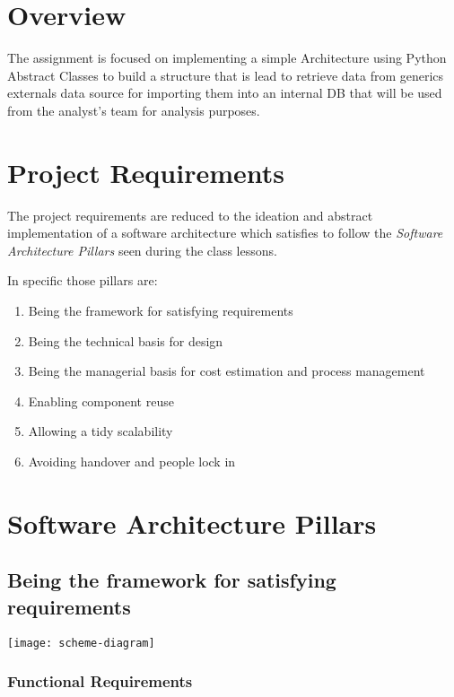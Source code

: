 \section{Overview}

The assignment is focused on implementing a simple Architecture using Python Abstract Classes to build a structure that is lead to retrieve data from generics externals data source for importing them into an internal DB that will be used from the analyst’s team for analysis purposes.

\section{Project Requirements}

The project requirements are reduced to the ideation and abstract implementation of a software architecture which satisfies to follow the \textit{Software Architecture Pillars} seen during the class lessons.

In specific those pillars are:

\begin{enumerate}
	\item Being the framework for satisfying requirements
	\item Being the technical basis for design
	\item Being the managerial basis for cost estimation and process management
	\item Enabling component reuse
	\item Allowing a tidy scalability 
	\item Avoiding handover and people lock in
\end{enumerate}

\section{Software Architecture Pillars}

\subsection{Being the framework for satisfying requirements}

\begin{center}
\texttt{[image: scheme-diagram]}
\end{center}

\subsubsection{Functional Requirements}


